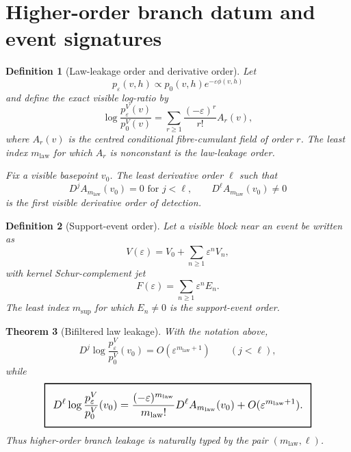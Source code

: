 \documentclass[11pt,a4paper]{article}
\numberwithin{equation}{section}
\newcommand{\geomboxed}[1]{%
  \setlength{\fboxsep}{8pt}%
  \setlength{\fboxrule}{0.9pt}%
  \fbox{\scalebox{1.12}{$\displaystyle #1$}}%
}
\theoremstyle{thmcompact}
\newtheorem{theorem}{Theorem}[section]
\newtheorem{definition}[theorem]{Definition}
\theoremstyle{remark}
\begin{document}
\section{Higher-order branch datum and event signatures}

\begin{definition}[Law-leakage order and derivative order]
\label{def:law-leakage-order}
Let
\begin{equation}
p_\varepsilon(v,h)\propto p_0(v,h)e^{-\varepsilon\phi(v,h)}
\end{equation}
and define the exact visible log-ratio by
\begin{equation}
\log\frac{p_\varepsilon^V(v)}{p_0^V(v)}
=\sum_{r\ge 1}\frac{(-\varepsilon)^r}{r!}A_r(v),
\end{equation}
where $A_r(v)$ is the centred conditional fibre-cumulant field of order $r$. The least index $m_{\mathrm{law}}$ for which $A_r$ is nonconstant is the \emph{law-leakage order}.

Fix a visible basepoint $v_0$. The least derivative order $\ell$ such that
\begin{equation}
D^jA_{m_{\mathrm{law}}}(v_0)=0 \text{ for } j<\ell,
\qquad
D^\ell A_{m_{\mathrm{law}}}(v_0)\neq 0
\end{equation}
is the \emph{first visible derivative order of detection}.
\end{definition}

\begin{definition}[Support-event order]
\label{def:support-order}
Let a visible block near an event be written as
\begin{equation}
V(\varepsilon)=V_0+\sum_{n\ge 1}\varepsilon^nV_n,
\end{equation}
with kernel Schur-complement jet
\begin{equation}
F(\varepsilon)=\sum_{n\ge 1}\varepsilon^nE_n.
\end{equation}
The least index $m_{\mathrm{sup}}$ for which $E_n\neq 0$ is the \emph{support-event order}.
\end{definition}

\begin{theorem}[Bifiltered law leakage]
\label{thm:bifiltered-law-leakage}
With the notation above,
\begin{equation}
D^j\log\frac{p_\varepsilon^V}{p_0^V}(v_0)=O(\varepsilon^{m_{\mathrm{law}}+1})
\qquad (j<\ell),
\end{equation}
while
\begin{equation}
\geomboxed{D^\ell\log\frac{p_\varepsilon^V}{p_0^V}(v_0)
=\frac{(-\varepsilon)^{m_{\mathrm{law}}}}{m_{\mathrm{law}}!}D^\ell A_{m_{\mathrm{law}}}(v_0)+O(\varepsilon^{m_{\mathrm{law}}+1}).}
\end{equation}
Thus higher-order branch leakage is naturally typed by the pair $(m_{\mathrm{law}},\ell)$.
\end{theorem}
\end{document}
